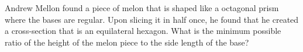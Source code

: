 Andrew Mellon found a piece of melon that is shaped like a octagonal prism where the bases are regular. Upon slicing it in half once, he found that he created a cross-section that is an equilateral hexagon. What is the minimum possible ratio of the height of the melon piece to the side length of the base?
